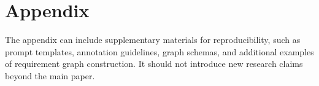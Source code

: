 \section{Appendix}
\label{appendix}

The appendix can include supplementary materials for reproducibility, such as prompt templates, annotation guidelines, graph schemas, and additional examples of requirement graph construction.
It should not introduce new research claims beyond the main paper.
